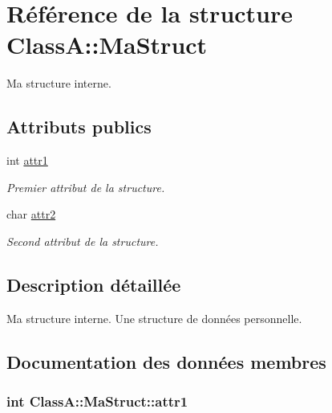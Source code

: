 \hypertarget{struct_class_a_1_1_ma_struct}{
\section{Référence de la structure ClassA::MaStruct}
\label{struct_class_a_1_1_ma_struct}
}


Ma structure interne.  
\subsection*{Attributs publics}
\begin{DoxyCompactItemize}
\item 
int \hyperlink{struct_class_a_1_1_ma_struct_a3439feaf6316628cf77919d9f4b2519a}{attr1}
\begin{DoxyCompactList}\small\item\em Premier attribut de la structure. \item\end{DoxyCompactList}\item 
char \hyperlink{struct_class_a_1_1_ma_struct_aaaa68ea043748cccd75e3c0403ea4d87}{attr2}
\begin{DoxyCompactList}\small\item\em Second attribut de la structure. \item\end{DoxyCompactList}\end{DoxyCompactItemize}


\subsection{Description détaillée}
Ma structure interne. Une structure de données personnelle. 

\subsection{Documentation des données membres}
\hypertarget{struct_class_a_1_1_ma_struct_a3439feaf6316628cf77919d9f4b2519a}{
\subsubsection[{attr1}]{\setlength{\rightskip}{0pt plus 5cm}int {\bf ClassA::MaStruct::attr1}}}
\label{struct_class_a_1_1_ma_struct_a3439feaf6316628cf77919d9f4b2519a}


